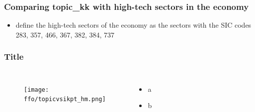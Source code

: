 \documentclass{beamer}
\newcommand{\ffo}{dicfullmc10thr10defnob40noa1_4t}
\newcommand{\ffovi}{dicfullmc5thr10_default_flt_3t}
\newcommand{\insertfigure}[2]{
\begin{figure}[h!]
  \centering
  \texttt{[image: \\ffo/\#1]}
  \centering
  \captionsetup{font=scriptsize}
  \caption{#2}
  \label{fig:#1}
\end{figure}
}
\begin{document}
\begin{frame}
\label{slide:kk_by_tech}
  \frametitle{Comparing topic\_kk with high-tech sectors in the economy}
  \begin{itemize}
  \item \cite{Brown2009-zp} define the high-tech sectors of the economy as the sectors with the SIC codes 283, 357, 466, 367, 382, 384, 737 
  
\end{itemize}
 \end{frame}


\begin{frame}
\label{slide:kkrisk_by_ik}
\frametitle{Title}
       \begin{columns}
             \begin{figure}[h!]
		  \centering
		  \texttt{[image: \\ffo/topicvsikpt\_hm.png]}
		  \centering
		  \captionsetup{font=scriptsize}
		  \label{fig:topicvsikpt_hm}
			\end{figure}
          \scriptsize
              \begin{itemize}
			  \item a
			  \item b
			\end{itemize}
	  \end{columns} 
\end{frame}


%
\end{document}

